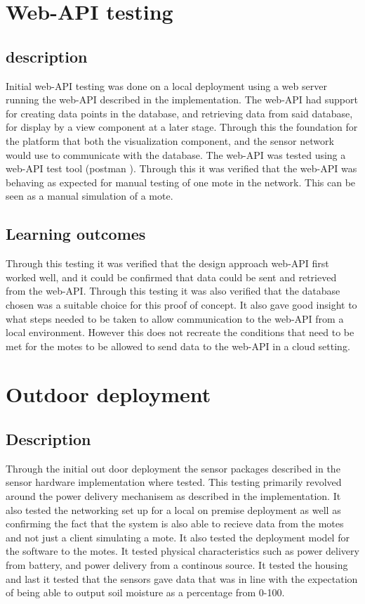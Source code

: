 \documentclass[]{uiophd}
\begin{document}
\section{Web-API testing}
\subsection{description}
Initial web-API testing was done on a local deployment using a web server running the web-API described in the implementation. The web-API had support for creating data points in the database, and retrieving data from said database, for display by a view component at a later stage. Through this the foundation for the platform that both the visualization component, and the sensor network would use to communicate with the database. The web-API was tested using a web-API test tool (postman \cite{postman}). Through this it was verified that the web-API was behaving as expected for manual testing of one mote in the network. This can be seen as a manual simulation of a mote.
\subsection{Learning outcomes}
Through this testing it was verified that the design approach web-API first worked well, and it could be confirmed that data could be sent and retrieved from the web-API. Through this testing it was also verified that the database chosen was a suitable choice for this proof of concept. It also gave good insight to what steps needed to be taken to allow communication to the web-API from a local environment. However this does not recreate the conditions that need to be met for the motes to be allowed to send data to the web-API in a cloud setting.

\section{Outdoor deployment}
\subsection{Description}
Through the initial out door deployment the sensor packages described in the sensor hardware implementation where tested. This testing primarily revolved around the power delivery mechanisem as described in the implementation. It also tested the networking set up for a local on premise deployment as well as confirming the fact that the system is also able to recieve data from the motes and not just a client simulating a mote. It also tested the deployment model for the software to the motes. It tested physical characteristics such as power delivery from battery, and power delivery from a continous source. It tested the housing  and last it tested that the sensors gave data that was in line with the expectation of being able to output soil moisture as a percentage from 0-100.
\end{document}

